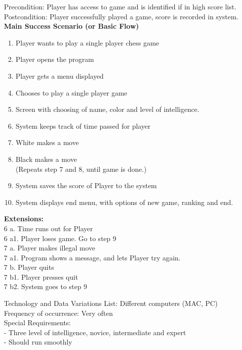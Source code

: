\documentclass{article}
\begin{document}
\begin{flushleft}
	Precondition: Player has access to game and is identified if in high score list.\\
	\vspace{1mm}
	Postcondition: Player successfully played a game, score is recorded in system.\\
	\vspace{2mm}
\newpage
	\textbf{Main Success Scenario (or Basic Flow)}\\




\begin{enumerate}	
\item Player wants to play a single player chess game
\item Player opens the program
\item Player gets a menu displayed
\item Chooses to play a single player game
\item Screen with choosing of name, color and level of intelligence.
\item System keeps track of time passed for player
\item White makes a move
\item Black makes a move\\
(Repeats step 7 and 8, until game is done.)
\item System saves the score of Player to the system
\item System displays end menu, with options of new game, ranking and end.
\end{enumerate}

\textbf{Extensions:}\\
6 a. Time runs out for Player\\
6 a1. Player loses game. Go to step 9\\
7 a. Player makes illegal move\\
7 a1. Program shows a message, and lets Player try again.\\
7 b. Player quits\\
7 b1. Player presses quit\\
7 b2. System goes to step 9\\
\vspace{3mm}

Technology and Data Variations List:\hspace{3mm} Different computers (MAC, PC)\\
Frequency of occurrence:\hspace{3mm} Very often\\
Special Requirements:\\
\hspace{5mm} - Three level of intelligence, novice, intermediate and expert\\
\hspace{5mm} - Should run smoothly\\
\vspace{10mm}


\end{flushleft}
\end{document}
